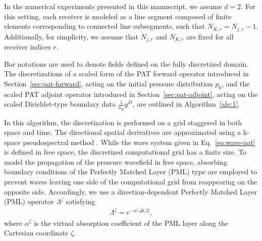 \documentclass[11pt,reqno]{amsart}
\theoremstyle{remark}
\begin{document}
In the numerical experiments presented in this manuscript, we assume \( d = 2 \). For this setting, each receiver is modeled as a line segment composed of finite elements
corresponding to connected line subsegments, such that \( N_{K,r} = N_{j,r} - 1 \). Additionally, for simplicity, we assume that \(N_{j,r}\) and \(N_{K,r}\) are fixed for all receiver indices \(r\).

Bar notations are used to denote fields defined on the fully discretized domain. The discretizations of a scaled form of the PAT forward operator introduced in Section~\ref{sec:pat-forward}, acting on the initial pressure distribution \(p_0\), and the scaled PAT adjoint operator introduced in Section~\ref{sec:pat-adjoint}, acting on the scaled Dirichlet-type boundary data \(\frac{1}{a_R} y^D\), are outlined in Algorithm~\ref{alg:1}. 

In this algorithm, the discretization is performed on a grid staggered in both space and time. The directional spatial derivatives are approximated using a k-space pseudospectral method \cite{Tabei2002,Treeby2010}. While the wave system given in Eq.~\eqref{eq:wave-pat} is defined in free space, the discretized computational grid has a finite size. To model the propagation of the pressure wavefield in free space, absorbing boundary conditions of the Perfectly Matched Layer (PML) type are employed to prevent waves leaving one side of the computational grid from reappearing on the opposite side. Accordingly, we use a direction-dependent Perfectly Matched Layer (PML) operator \(\Lambda^{\zeta}\) satisfying
\begin{align}
\Lambda^{\zeta} = e^{-\alpha^{\zeta} \Delta t / 2},
\end{align}
where \(\alpha^{\zeta}\) is the virtual absorption coefficient of the PML layer along the Cartesian coordinate \(\zeta\).
\end{document}

